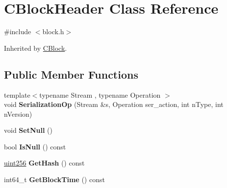 \hypertarget{class_c_block_header}{}\section{C\+Block\+Header Class Reference}
\label{class_c_block_header}


{\ttfamily \#include $<$block.\+h$>$}



Inherited by \mbox{\hyperlink{class_c_block}{C\+Block}}.

\subsection*{Public Member Functions}
\begin{DoxyCompactItemize}
\item 
\mbox{\label{class_c_block_header_ae564e96da45702d79c83e3ad0ce19873}} 
{\footnotesize template$<$typename Stream , typename Operation $>$ }\\void {\bfseries Serialization\+Op} (Stream \&s, Operation ser\+\_\+action, int n\+Type, int n\+Version)
\item 
\mbox{\label{class_c_block_header_ae39c04a4357417d98954a51f53beb78a}} 
void {\bfseries Set\+Null} ()
\item 
\mbox{\label{class_c_block_header_afb875dba7ce6e26c01509244e3cd950f}} 
bool {\bfseries Is\+Null} () const
\item 
\mbox{\label{class_c_block_header_af0239f86a13f622a826e9eea66b2d7f3}} 
\mbox{\hyperlink{classuint256}{uint256}} {\bfseries Get\+Hash} () const
\item 
\mbox{\label{class_c_block_header_abad634d81d4c810390fa2080d79633e8}} 
int64\+\_\+t {\bfseries Get\+Block\+Time} () const
\end{DoxyCompactItemize}
